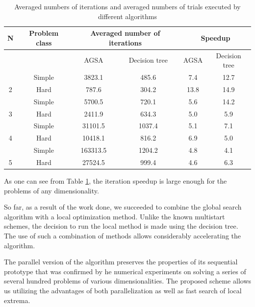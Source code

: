 \documentclass{svproc}
\begin{document}
\begin{table}[h!]
	\caption{Averaged numbers of iterations and averaged numbers of trials executed by different 
		algorithms}
	\label{tab:2}
	\centering
	\begin{tabular}{|c|c|c|c|c|c|}
		\hline
		
		N & Problem class & \multicolumn{2}{c|}{Averaged number of iterations} & \multicolumn{2}{c|}{Speedup} \\ \hline
		& ~ & AGSA & Decision tree & AGSA & Decision tree \\ \hline
		& Simple & 3823.1   & 485.6  & 7.4   & 12.7 \\ \hline
		2  & Hard & 787.6    & 304.2  & 13.8  & 14.9 \\ \hline
		& Simple & 5700.5   & 720.1  & 5.6   & 14.2  \\ \hline
		3  & Hard & 2411.9   & 634.3  & 5.0   & 5.9  \\ \hline
		& Simple & 31101.5  & 1037.4 & 5.1   & 7.1  \\ \hline
		4  & Hard & 10418.1  & 816.2  & 6.9   & 5.0  \\ \hline
		& Simple & 163313.5 & 1204.2 & 4.8   & 4.1 \\ \hline
		5  & Hard & 27524.5  & 999.4  & 4.6   & 6.3  \\ \hline
	\end{tabular}
\end{table}


As one can see from Table \ref{tab:2},  the iteration speedup is large enough for the problems of any  dimensionality. 

So far, as a result of the work done, we succeeded to combine the global search algorithm with a local  optimization method.  Unlike the known multistart schemes, the decision to run the local method is made using the decision  tree. The use of such a combination of methods allows considerably accelerating the algorithm. 

The parallel version of the algorithm preserves the properties of its sequential prototype that was  confirmed by he numerical experiments on solving a series of several hundred problems of various  dimensionalities. The proposed scheme allows us utilizing the advantages of both parallelization as well as fast search of local extrema.
\end{document}
